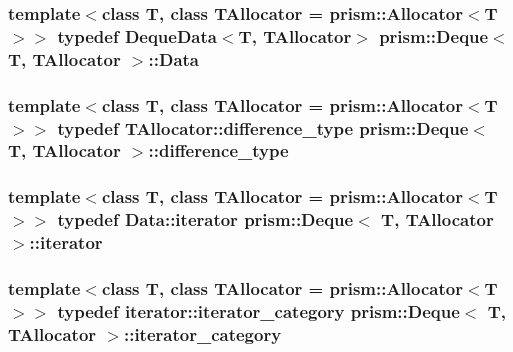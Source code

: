\subsubsection[{\texorpdfstring{Data}{Data}}]{\setlength{\rightskip}{0pt plus 5cm}template$<$class T, class T\+Allocator = prism\+::\+Allocator$<$\+T$>$$>$ typedef {\bf Deque\+Data}$<$T, T\+Allocator$>$ {\bf prism\+::\+Deque}$<$ T, T\+Allocator $>$\+::{\bf Data}}\hypertarget{classprism_1_1_deque_a17bc7f491baf38861449e99635636d2f}{}\label{classprism_1_1_deque_a17bc7f491baf38861449e99635636d2f}
\subsubsection[{\texorpdfstring{difference\+\_\+type}{difference_type}}]{\setlength{\rightskip}{0pt plus 5cm}template$<$class T, class T\+Allocator = prism\+::\+Allocator$<$\+T$>$$>$ typedef T\+Allocator\+::difference\+\_\+type {\bf prism\+::\+Deque}$<$ T, T\+Allocator $>$\+::{\bf difference\+\_\+type}}\hypertarget{classprism_1_1_deque_a0678b4b8619b996e2b3de3b8134b6b9f}{}\label{classprism_1_1_deque_a0678b4b8619b996e2b3de3b8134b6b9f}
\subsubsection[{\texorpdfstring{iterator}{iterator}}]{\setlength{\rightskip}{0pt plus 5cm}template$<$class T, class T\+Allocator = prism\+::\+Allocator$<$\+T$>$$>$ typedef Data\+::iterator {\bf prism\+::\+Deque}$<$ T, T\+Allocator $>$\+::{\bf iterator}}\hypertarget{classprism_1_1_deque_a263fd8daf307719cd101c97028fe68a1}{}\label{classprism_1_1_deque_a263fd8daf307719cd101c97028fe68a1}
\subsubsection[{\texorpdfstring{iterator\+\_\+category}{iterator_category}}]{\setlength{\rightskip}{0pt plus 5cm}template$<$class T, class T\+Allocator = prism\+::\+Allocator$<$\+T$>$$>$ typedef iterator\+::iterator\+\_\+category {\bf prism\+::\+Deque}$<$ T, T\+Allocator $>$\+::{\bf iterator\+\_\+category}}\hypertarget{classprism_1_1_deque_a10ecd23455d0619cbe070eb91b340f37}{}\label{classprism_1_1_deque_a10ecd23455d0619cbe070eb91b340f37}
